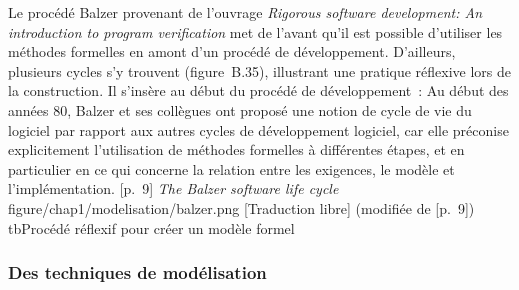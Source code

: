 {Le procédé Balzer provenant de l'ouvrage \textit{Rigorous software development: An introduction to program verification} met de l'avant qu'il est possible d'utiliser les méthodes formelles en amont d'un procédé de développement. D'ailleurs, plusieurs cycles s'y trouvent (figure~B.35), illustrant une pratique réflexive lors de la construction. Il s'insère au début du procédé de développement~:
 {Au début des années 80, Balzer et ses collègues ont proposé une notion de cycle de vie du logiciel \elide par rapport aux autres cycles de développement logiciel, car elle préconise explicitement l'utilisation de méthodes formelles à différentes étapes, et en particulier en ce qui concerne la relation entre les exigences, le modèle et l'implémentation.} {[p.~9]}
\figmediumen
{\textit{The Balzer software life cycle}}
{figure/chap1/modelisation/balzer.png}
{[Traduction libre] (modifiée de [p.~9])}
{}{}{tb}{Procédé réflexif pour créer un modèle formel}

}{}

\subsubsection{Des techniques de modélisation}

